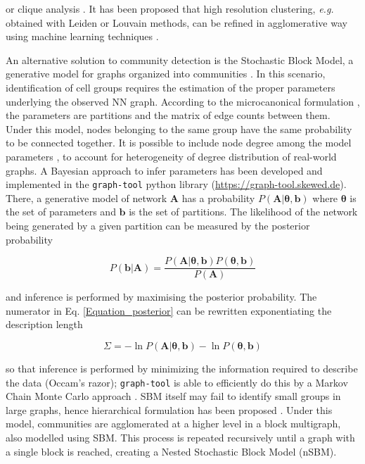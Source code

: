 \documentclass[10pt]{article}
\begin{document}
\cite{baran_2019, Tang_Sackton_2020} or clique analysis \cite{xu_2015}. It has been proposed that high resolution clustering, \emph{e.g.} obtained with Leiden or Louvain methods, can be refined in agglomerative way using machine learning techniques \cite{miao_2020}.

An alternative solution to community detection is the Stochastic Block Model, a generative model for graphs organized into communities \cite{holland_1983}. In this scenario, identification of cell groups requires the estimation of the proper parameters underlying the observed NN graph. According to the microcanonical formulation \cite{peixoto_2017}, the parameters are partitions and the matrix of edge counts between them. Under this model, nodes belonging to the same group have the same probability to be connected together. It is possible to include node degree among the model parameters \cite{karrer_2011}, to account for heterogeneity of degree distribution of real-world graphs. A Bayesian approach to infer parameters has been developed \cite{peixoto_2013} and implemented in the \texttt{graph-tool} python library (\href{https://graph-tool.skewed.de}{https:/\slash graph-tool.skewed.de}). There, a generative model of network $\boldsymbol A$ has a probability $P(\boldsymbol A|\boldsymbol\theta, \boldsymbol b)$ where \textbf{$\boldsymbol\theta$} is the set of parameters and \textbf{\emph{$\boldsymbol b$}} is the set of partitions. The likelihood of the network being generated by a given partition can be measured by the posterior probability


\begin{equation}
P(\boldsymbol b | \boldsymbol A) = \frac{P(\boldsymbol A|\boldsymbol\theta, \boldsymbol b)P(\boldsymbol\theta, \boldsymbol b)}{P(\boldsymbol A)}
\label{Equation_posterior}
\end{equation}

and inference is performed by maximising the posterior probability. The numerator in Eq. \ref{Equation_posterior} can be rewritten exponentiating the description length

\begin{equation}
\Sigma = -\ln P(\boldsymbol A|\boldsymbol\theta, \boldsymbol b) - \ln P(\boldsymbol\theta, \boldsymbol b)
\label{Equation_entropy}
\end{equation}

so that inference is performed by minimizing the information required to describe the data (Occam's razor); \texttt{graph-tool} is able to efficiently do this by a Markov Chain Monte Carlo approach \cite{peixoto_2014}. SBM itself may fail to identify small groups in large graphs, hence hierarchical formulation has been proposed \cite{peixoto_2014_h}. Under this model, communities are agglomerated at a higher level in a block multigraph, also modelled using SBM. This process is repeated recursively until a graph with a single block is reached, creating a Nested Stochastic Block Model (nSBM).
\end{document}
